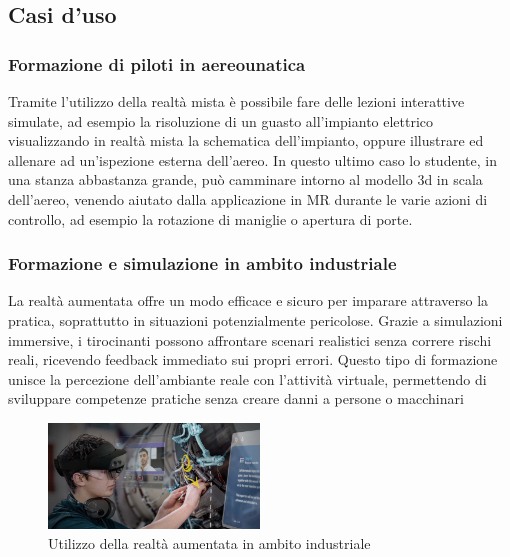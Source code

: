 \subsection{Casi d'uso}
\subsubsection{Formazione di piloti in aereounatica}
Tramite l'utilizzo della realtà mista è possibile fare delle lezioni interattive simulate, ad esempio la risoluzione di un guasto all'impianto elettrico visualizzando in realtà mista la schematica dell'impianto, oppure illustrare ed allenare ad un'ispezione esterna dell'aereo. In questo ultimo caso lo studente, in una stanza abbastanza grande, può camminare intorno al modello 3d in scala dell'aereo, venendo aiutato dalla applicazione in MR durante le varie azioni di controllo, ad esempio la rotazione di maniglie o apertura di porte.\cite{MixedRealityUseCasesforPilotTraining}

\subsubsection{Formazione e simulazione in ambito industriale}
La realtà aumentata offre un modo efficace e sicuro per imparare attraverso la pratica, soprattutto in situazioni potenzialmente pericolose. Grazie a simulazioni immersive, i tirocinanti possono affrontare scenari realistici senza correre rischi reali, ricevendo feedback immediato sui propri errori. Questo tipo di formazione unisce la percezione dell'ambiante reale con l'attività virtuale, permettendo di sviluppare competenze pratiche senza creare danni a persone o macchinari \cite{MicrosoftTrainingandSimulationforEnterprises}
\begin{figure}[H]
    \centering
    \includegraphics[width=0.5\textwidth,height=0.5\textheight,keepaspectratio]{figures/chapter_1/hololens_in_azienda.jpg}
    \caption{Utilizzo della realtà aumentata in ambito industriale}
\end{figure}

